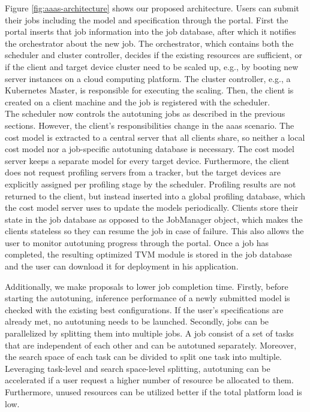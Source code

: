 Figure \ref{fig:aaas-architecture} shows our proposed architecture. Users can submit their jobs including the model and specification through the portal. First the portal inserts that job information into the job database, after which it notifies the orchestrator about the new job. The orchestrator, which contains both the scheduler and cluster controller, decides if the existing resources are sufficient, or if the client and target device cluster need to be scaled up, e.g., by booting new server instances on a cloud computing platform. The cluster controller, e.g., a Kubernetes Master, is responsible for executing the scaling. Then, the client is created on a client machine and the job is registered with the scheduler.\\
The scheduler now controls the autotuning jobs as described in the previous sections. However, the client's responsibilities change in the \gls{aaas} scenario. The cost model is extracted to a central server that all clients share, so neither a local cost model nor a job-specific autotuning database is necessary. The cost model server keeps a separate model for every target device. Furthermore, the client does not request profiling servers from a tracker, but the target devices are explicitly assigned per profiling stage by the scheduler. Profiling results are not returned to the client, but instead inserted into a global profiling database, which the cost model server uses to update the models periodically. Clients store their state in the job database as opposed to the JobManager object, which makes the clients stateless so they can resume the job in case of failure. This also allows the user to monitor autotuning progress through the portal. Once a job has completed, the resulting optimized TVM module is stored in the job database and the user can download it for deployment in his application.

Additionally, we make proposals to lower job completion time. Firstly, before starting the autotuning, inference performance of a newly submitted model is checked with the existing best configurations. If the user's specifications are already met, no autotuning needs to be launched. Secondly, jobs can be parallelized by splitting them into multiple jobs. A job consist of a set of tasks that are independent of each other and can be autotuned separately. Moreover, the search space of each task can be divided to split one task into multiple. Leveraging task-level and search space-level splitting, autotuning can be accelerated if a user request a higher number of resource be allocated to them. Furthermore, unused resources can be utilized better if the total platform load is low.


